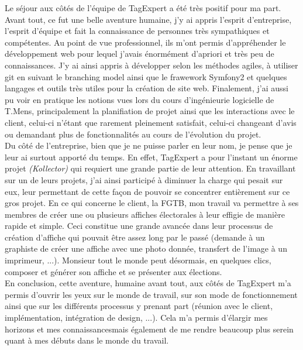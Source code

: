 \documentclass{article}
\begin{document}
\begin{sffamily}
Le séjour aux côtés de l'équipe de TagExpert a été très positif pour ma part. Avant tout, ce fut une belle aventure humaine, j'y ai appris l'esprit d'entreprise, l'esprit 
d'équipe et fait la connaissance de personnes très sympathiques et compétentes. Au point de vue professionnel, ils m'ont permis d'appréhender le développement web pour 
lequel j'avais énormément d'apriori et très peu de connaissances. J'y ai ainsi appris à développer selon les méthodes agiles, à utiliser git en suivant le branching model 
ainsi que le frawework Symfony2 et quelques langages et outils très utiles pour la création de site web. Finalement, j'ai aussi pu voir en pratique les notions vues lors du 
cours d'ingénieurie logicielle de T.Mens, principalement la planifiation de projet ainsi que les interactions avec le client, celui-ci n'étant que rarement pleinement 
satisfait, celui-ci changeant d'avis ou demandant plus de fonctionnalités au cours de l'évolution du projet.\\


Du côté de l'entreprise, bien que je ne puisse parler en leur nom, je pense que je leur ai surtout apporté du temps. En effet, TagExpert a pour l'instant un énorme projet 
\textit{(Kollector)} qui requiert une grande partie de leur attention. En travaillant sur un de leurs projets, j'ai ainsi participé à diminuer la charge qui pesait sur 
eux, leur permettant de cette façon de pouvoir se concentrer entièrement sur ce gros projet. En ce qui concerne le client, la FGTB, mon travail va permettre à ses membres de 
créer une ou plusieurs affiches électorales à leur effigie de manière rapide et simple. Ceci constitue une grande avancée dans leur processus de création d'affiche qui 
pouvait être assez long par le passé (demande à un graphiste de créer une affiche avec une photo donnée, transfert de l'image à un imprimeur, ...). Monsieur tout le monde 
peut désormais, en quelques clics, composer et générer son affiche et se présenter aux élections. \\

En conclusion, cette aventure, humaine avant tout, aux côtés de TagExpert m'a permis d'ouvrir les yeux sur le monde de travail, sur son mode de fonctionnement ainsi que sur 
les différents processus y prenant part (réunion avec le client, implémentation, intégration de design, ...). Cela m'a permis d'élargir mes horizons et mes connaissancesmais 
également de me rendre beaucoup plus serein quant à mes débuts dans le monde du travail.

\newpage


\end{sffamily}
\end{document}
